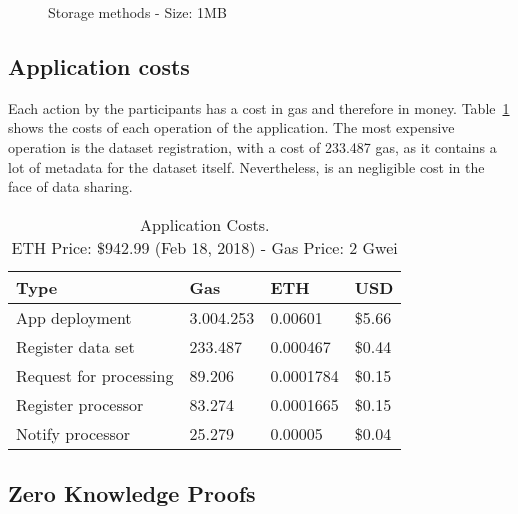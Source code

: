 \begin{figure}[!ht]
  \centering
  \caption{Storage methods - Size: 1MB}
  \label{fig:storage:charts:1mb}
\end{figure}

\subsection{Application costs}
\label{evaluation:app_costs}

Each action by the participants has a cost in gas and therefore in money. Table~\ref{table:app_costs} shows the costs of each operation of the application. The most expensive operation is the dataset registration, with a cost of 233.487 gas, as it contains a lot of metadata for the dataset itself. Nevertheless, is an negligible cost in the face of data sharing.

\begin{table}[!htb]
\centering
\captionsetup{format=hang, justification=centering}
\caption{Application Costs.\\ ETH Price: \$942.99 (Feb 18, 2018) - Gas Price: 2 Gwei}
\begin{tabular}{|l|l|l|l|}
\hline
 Type & Gas & ETH & USD \\ \hline
 App deployment & 3.004.253 & 0.00601 & \$5.66 \\ \hline
 Register data set & 233.487 & 0.000467 & \$0.44 \\ \hline
 Request for processing & 89.206 & 0.0001784 & \$0.15 \\ \hline
 Register processor & 83.274 & 0.0001665 & \$0.15 \\ \hline
 Notify processor & 25.279 & 0.00005 & \$0.04 \\ \hline
\end{tabular}
\label{table:app_costs}
\end{table}

\subsection{Zero Knowledge Proofs}
\label{evaluation:zkp}

